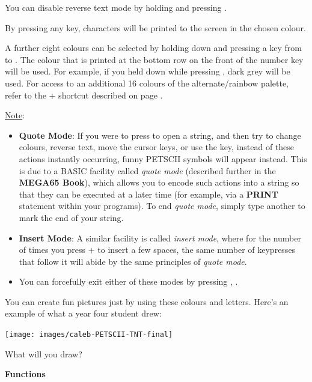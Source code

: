 You can disable reverse text mode by holding  and pressing .

By pressing any key, characters will be printed to the screen in the chosen colour.

A further eight colours can be selected by holding down \megasymbolkey and pressing a key from  to .
The colour that is printed at the bottom row on the front of the number key will be used. For example, if you held
\megasymbolkey down while pressing , dark grey will be used. For access to an additional 16 colours of the alternate/rainbow palette, refer to the  +  shortcut described on page \pageref{appendix:controlcodes}.

\underline{Note}:
\begin{itemize}
  \item {\bf Quote Mode}: If you were to press  to open a string, and then try to change
colours, reverse text, move the cursor keys, or use the  key, instead
of these actions instantly occurring, funny PETSCII symbols will appear instead. This is
due to a BASIC facility called {\it quote mode} (described further in the \textbf{MEGA65 Book}),
which allows you to encode such actions into a string so that they can be executed at a later
time (for example, via a {\bf PRINT} statement within your programs). To end {\it quote mode}, simply
type another  to mark the end of your string.
  \item {\bf Insert Mode}: A similar facility is called
{\it insert mode}, where for the number of times you press  + 
to insert a few spaces, the same number of keypresses that follow it will abide by the same
principles of {\it quote mode}.
  \item You can forcefully exit either of these modes by pressing , .
\end{itemize}

\needspace{4cm}
You can create fun pictures just by using these colours and letters.  Here's an example of what a year four student drew:

\begin{center}
\texttt{[image: images/caleb-PETSCII-TNT-final]}
\end{center}

What will you draw?

\needspace{2cm}
\textbf{Functions}

